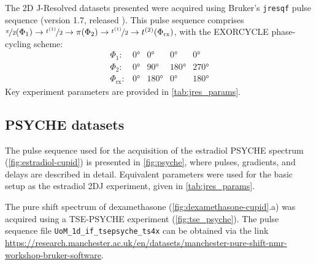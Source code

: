 The 2D J-Resolved datasets presented were acquired using Bruker's
\texttt{jresqf} pulse sequence (version 1.7, released
). This pulse sequence comprises
 $\nicefrac{\pi}{2}(\Phi_1) \rightarrow \nicefrac{t^{(1)}}{2} \rightarrow
\pi(\Phi_{2}) \rightarrow \nicefrac{t^{(1)}}{2} \rightarrow t^{(2)}(\Phi_{\text{rx}})$, with
the EXORCYCLE phase-cycling scheme\cite[Section 11.6]{Keeler2010}:
\begin{equation*}
    \begin{array}{lllll}
        \Phi_{1}: & \ang{0} & \ang{0} & \ang{0} & \ang{0} \\
        \Phi_{2}: & \ang{0} & \ang{90} & \ang{180} & \ang{270} \\
        \Phi_{\text{rx}}: & \ang{0} & \ang{180} & \ang{0} & \ang{180}
    \end{array}
\end{equation*}
Key experiment parameters are provided in \cref{tab:jres_params}.


\subsection{\acs{PSYCHE} datasets}
The pulse sequence used for the acquisition of the estradiol \ac{PSYCHE}
spectrum (\cref{fig:estradiol-cupid}) is presented in
\cref{fig:psyche}, where
pulses, gradients, and delays are described in detail. Equivalent parameters
were used for the basic setup as the estradiol 2DJ experiment, given in
\cref{tab:jres_params}.

The pure shift spectrum of dexamethasone (\cref{fig:dexamethasone-cupid}.a) was
acquired using a \ac{TSE-PSYCHE}
experiment (\cref{fig:tse_psyche}). The pulse sequence file
\texttt{UoM\_1d\_if\_tsepsyche\_ts4x} can be obtained via the link
\url{https://research.manchester.ac.uk/en/datasets/manchester-pure-shift-nmr-workshop-bruker-software}.

